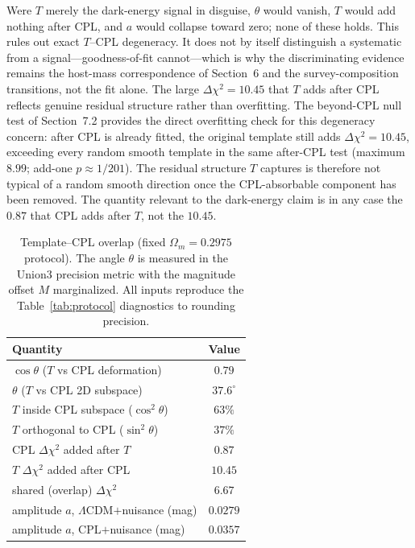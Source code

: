 \documentclass[11pt]{article}
\begin{document}
Were $T$ merely the dark-energy signal in disguise, $\theta$ would vanish, $T$ would add
nothing after CPL, and $a$ would collapse toward zero; none of these holds. This rules
out exact $T$--CPL degeneracy. It does not by itself distinguish a systematic from a
signal---goodness-of-fit cannot---which is why the discriminating evidence remains the
host-mass correspondence of Section~6 and the survey-composition
transitions, not the fit alone. The large $\Delta\chi^2=10.45$ that $T$ adds after CPL
reflects genuine residual structure rather than overfitting. The beyond-CPL null test of
Section~7.2 provides the direct overfitting check for this degeneracy concern: after CPL
is already fitted, the original template still adds $\Delta\chi^2=10.45$, exceeding every
random smooth template in the same after-CPL test (maximum $8.99$; add-one $p\approx1/201$).
The residual structure $T$ captures is therefore not typical of a random smooth direction
once the CPL-absorbable component has been removed. The quantity relevant to the
dark-energy claim is in any case the $0.87$ that CPL adds after $T$, not the $10.45$.

\begin{table}[h]
\centering
\caption{Template--CPL overlap (fixed $\Omega_m=0.2975$ protocol). The angle $\theta$
is measured in the Union3 precision metric with the magnitude offset $M$ marginalized.
All inputs reproduce the Table~\ref{tab:protocol} diagnostics to rounding precision.}
\label{tab:overlap}
\begin{tabular}{lc}
\toprule
Quantity & Value \\
\midrule
$\cos\theta$ ($T$ vs CPL deformation)          & $0.79$ \\
$\theta$ ($T$ vs CPL 2D subspace)              & $37.6^\circ$ \\
$T$ inside CPL subspace ($\cos^2\theta$)       & $63\%$ \\
$T$ orthogonal to CPL ($\sin^2\theta$)         & $37\%$ \\
CPL $\Delta\chi^2$ added after $T$             & $0.87$ \\
$T$ $\Delta\chi^2$ added after CPL             & $10.45$ \\
shared (overlap) $\Delta\chi^2$                & $6.67$ \\
amplitude $a$, $\Lambda$CDM$+$nuisance (mag)   & $0.0279$ \\
amplitude $a$, CPL$+$nuisance (mag)            & $0.0357$ \\
\bottomrule
\end{tabular}
\end{table}
\end{document}
